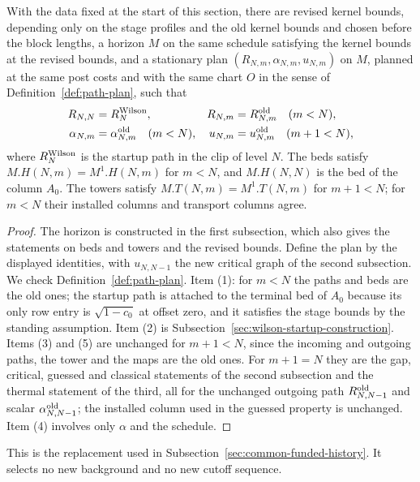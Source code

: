 \begin{proposition}
\label{prop:terminal-replacement}
With the data fixed at the start of this section, there are revised
kernel bounds, depending only on the stage profiles and the old
kernel bounds and chosen before the block lengths, a horizon $M$ on
the same schedule satisfying the kernel bounds at the revised
bounds, and a stationary plan
$(R_{N,m},\alpha_{N,m},u_{N,m})$ on $M$, planned at the same post
costs and with the same chart $O$ in the sense of
Definition~\ref{def:path-plan}, such that
\begin{align*}
 R_{N,N}&=R^{\rm Wilson}_N,&
 R_{N,m}&=R^{\rm old}_{N,m}\quad(m<N),\\
 \alpha_{N,m}&=\alpha^{\rm old}_{N,m}\quad(m<N),&
 u_{N,m}&=u^{\rm old}_{N,m}\quad(m+1<N),
\end{align*}
where $R^{\rm Wilson}_N$ is the startup path in the clip of level
$N$. The beds satisfy $M.H(N,m)=M^1.H(N,m)$ for $m<N$, and
$M.H(N,N)$ is the bed of the column $A_0$. The towers satisfy
$M.T(N,m)=M^1.T(N,m)$ for $m+1<N$; for $m<N$ their installed columns
and transport columns agree.
\end{proposition}
\begin{proof}
The horizon is constructed in the first subsection, which also gives
the statements on beds and towers and the revised bounds. Define the
plan by the displayed identities, with $u_{N,N-1}$ the new critical
graph of the second subsection. We check
Definition~\ref{def:path-plan}. Item (1): for $m<N$ the paths and
beds are the old ones; the startup path is attached to the terminal
bed of $A_0$ because its only row entry is $\sqrt{1-c_0}$ at offset
zero, and it satisfies the stage bounds by the standing assumption.
Item (2) is Subsection~\ref{sec:wilson-startup-construction}. Items (3)
and (5) are unchanged for $m+1<N$, since the incoming and outgoing
paths, the tower and the maps are the old ones. For $m+1=N$ they are
the gap, critical, guessed and classical statements of the second
subsection and the thermal statement of the third, all for the
unchanged outgoing path $R^{\rm old}_{N,N-1}$ and scalar
$\alpha^{\rm old}_{N,N-1}$; the installed column used in the guessed
property is unchanged. Item (4) involves only $\alpha$ and the
schedule.
\end{proof}

This is the replacement used in
Subsection~\ref{sec:common-funded-history}. It selects no new background
and no new cutoff sequence.
